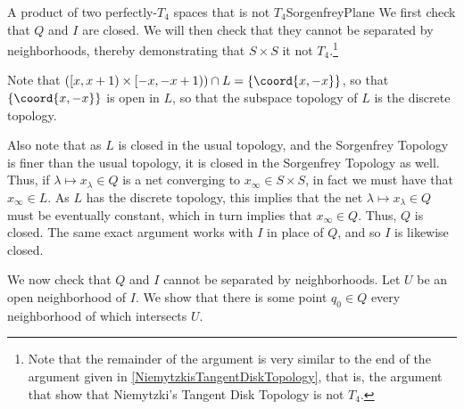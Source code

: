 \begin{exm}{A product of two perfectly-$T_4$ spaces that is not $T_4$}{SorgenfreyPlane}
We first check that $Q$ and $I$ are closed.  We will then check that they cannot be separated by neighborhoods, thereby demonstrating that $S\times S$ it not $T_4$.\footnote{Note that the remainder of the argument is very similar to the end of the argument given in \cref{NiemytzkisTangentDiskTopology}, that is, the argument that show that Niemytzki's Tangent Disk Topology is not $T_4$.}

Note that $\left( [x,x+1)\times [-x,-x+1)\right) \cap L=\{ \coord{x,-x}\}$, so that $\{ \coord{x,-x}\}$ is open in $L$, so that the subspace topology of $L$ is the discrete topology.

Also note that as $L$ is closed in the usual topology, and the Sorgenfrey Topology is finer than the usual topology, it is closed in the Sorgenfrey Topology as well.  Thus, if $\lambda \mapsto x_{\lambda}\in Q$ is a net converging to $x_{\infty}\in S\times S$, in fact we must have that $x_{\infty}\in L$.  As $L$ has the discrete topology, this implies that the net $\lambda \mapsto x_{\lambda}\in Q$ must be eventually constant, which in turn implies that $x_{\infty}\in Q$.  Thus, $Q$ is closed.  The same exact argument works with $I$ in place of $Q$, and so $I$ is likewise closed.

We now check that $Q$ and $I$ cannot be separated by neighborhoods.  Let $U$ be an open neighborhood of $I$.  We show that there is some point $q_0\in Q$ every neighborhood of which intersects $U$.


\end{exm}
